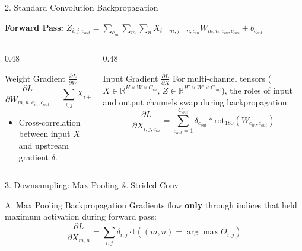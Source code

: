 \documentclass[aspectratio=169, 11pt]{beamer}
\newcommand{\nosrc}{}       %
\begin{document}
\begin{frame}{2. Standard Convolution Backpropagation}
  \nosrc
  \textbf{Forward Pass:} $Z_{i,j,c_{out}} = \sum_{c_{in}} \sum_{m} \sum_{n} X_{i+m, j+n, c_{in}} W_{m,n,c_{in},c_{out}} + b_{c_{out}}$
  
  \vspace{0.4cm}
  \begin{columns}[T]
    \begin{column}{0.48\textwidth}
      \begin{block}{Weight Gradient $\frac{\partial L}{\partial W}$}
        $$\frac{\partial L}{\partial W_{m,n,c_{in},c_{out}}} = \sum_{i,j} X_{i+m, j+n, c_{in}} \delta_{i,j,c_{out}}$$
        \begin{itemize}
          \item Cross-correlation between input $X$ and upstream gradient $\delta$.
        \end{itemize}
      \end{block}
    \end{column}
    
    \begin{column}{0.48\textwidth}
      \begin{block}{Input Gradient $\frac{\partial L}{\partial X}$}
        For multi-channel tensors ($X \in \mathbb{R}^{H \times W \times C_{in}}$, $Z \in \mathbb{R}^{H' \times W' \times C_{out}}$), the roles of input and output channels swap during backpropagation:$$\frac{\partial L}{\partial X_{i,j,c_{in}}} = \sum_{c_{out}=1}^{C_{out}} \delta_{c_{out}} * \text{rot}_{180}\left(W_{c_{in}, c_{out}}\right)$$
      \end{block}
    \end{column}
  \end{columns}
\end{frame}

\begin{frame}{3. Downsampling: Max Pooling \& Strided Conv}
  \nosrc
  \begin{block}{A. Max Pooling Backpropagation}
    Gradients flow \textbf{only} through indices that held maximum activation during forward pass:
    $$\frac{\partial L}{\partial X_{m,n}} = \sum_{i,j} \delta_{i,j} \cdot \mathbb{I}\left((m,n) = \arg\max \Theta_{i,j}\right)$$
  \end{block}

  \vspace{0.1cm}
\end{frame}
\end{document}

